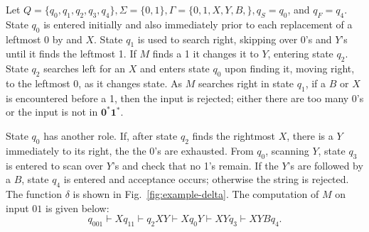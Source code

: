 \documentclass[pre,amssymb,showpacs,showkeys,preprint]{revtex4}
\begin{document}
Let $Q=\{q_0,q_1,q_2,q_3,q_4\}, \Sigma=\{0,1\}, \Gamma=\{0,1,X,Y,B,\}, q_S = q_0$, and $q_F = q_4$.
State $q_0$ is entered initially and also immediately prior to each replacement of a leftmost 0 by
and $X$.
State $q_1$ is used to search right, skipping over 0's and $Y$'s until it finds the leftmost 1.
If $M$ finds a 1 it changes it to $Y$, entering state $q_2$.
State $q_2$ searches left for an $X$ and enters state $q_0$ upon finding it, moving right, to the
leftmost 0, as it changes state.
As $M$ searches right in state $q_1$, if a $B$ or $X$ is encountered before a 1, then the input
is rejected; either there are too many 0's or the input is not in $\mathbf{0^*1^*}$.

State $q_0$ has another role.
If, after state $q_2$ finds the rightmost $X$, there is a $Y$ immediately to its right, the the 0's
are exhausted.
From $q_0$, scanning $Y$, state $q_3$ is entered to scan over $Y$'s and check that no 1's remain.
If the $Y$'s are followed by a $B$, state $q_4$ is entered and acceptance occurs; otherwise
the string is rejected.
The function $\delta$ is shown in Fig.~\ref{fig:example-delta}.
The computation of $M$ on input $01$ is given below:
\[
q_001 \vdash Xq_11  \vdash  q_2XY  \vdash  Xq_0Y  \vdash  XYq_3  \vdash XYBq_4.
\]

\end{document}
